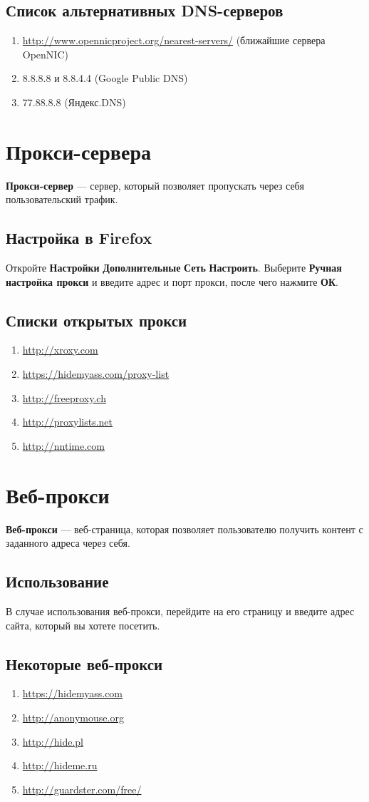 \subsection{Список альтернативных DNS-серверов}
\begin{enumerate}
\item \url{http://www.opennicproject.org/nearest-servers/} (ближайшие сервера OpenNIC)
\item 8.8.8.8 и 8.8.4.4 (Google Public DNS)
\item 77.88.8.8 (Яндекс.DNS)
\end{enumerate}
\section{Прокси-сервера}
\textbf{Прокси-сервер} --- сервер, который позволяет пропускать через себя пользовательский трафик.
\subsection{Настройка в Firefox}
Откройте \textbf{Настройки} \textrightarrow \textbf{Дополнительные} \textrightarrow \textbf{Сеть} \textrightarrow \textbf{Настроить}. Выберите \textbf{Ручная настройка прокси} и введите адрес и порт прокси, после чего нажмите \textbf{ОК}.
\subsection{Списки открытых прокси}
\begin{enumerate}
\item \url{http://xroxy.com}
\item \url{https://hidemyass.com/proxy-list}
\item \url{http://freeproxy.ch}
\item \url{http://proxylists.net}
\item \url{http://nntime.com}
\end{enumerate}
\section{Веб-прокси}
\textbf{Веб-прокси} --- веб-страница, которая позволяет пользователю получить контент с заданного адреса через себя.
\subsection{Использование}
В случае использования веб-прокси, перейдите на его страницу и введите адрес сайта, который вы хотете посетить.
\subsection{Некоторые веб-прокси}
\begin{enumerate}
\item \url{https://hidemyass.com}
\item \url{http://anonymouse.org}
\item \url{http://hide.pl}
\item \url{http://hideme.ru}
\item \url{http://guardster.com/free/}
\end{enumerate}
